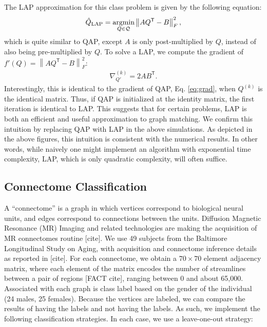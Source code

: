 \documentclass{article} %
\providecommand{\norm}[1]{\left \lVert#1 \right  \rVert}
\newcommand{\argmin}{\operatornamewithlimits{argmin}}
\newcommand{\T}{^{\ensuremath{\mathsf{T}}}}           %
\providecommand{\mc}[1]{\mathcal{#1}}
\providecommand{\mh}[1]{\hat{#1}}
\begin{document}
The LAP approximation  for this class problem is given by the following equation:
\begin{align} \label{eq:LAP}
	\mh{Q}_{\text{LAP}} = \argmin_{Q \in \mc{Q}} \norm{A Q\T - B }^2_F,
\end{align}
which is quite similar to QAP, except $A$ is only post-multiplied by $Q$, instead of also being pre-multiplied by $Q$. To solve a LAP, we compute the gradient of $f'(Q)=\norm{AQ\T-B}_F^2$:
\begin{align} \label{eq:grad2}
	\nabla_{Q'}^{(k)} = 2A B\T. 
\end{align}
Interestingly, this is identical to the gradient of QAP, Eq. \eqref{eq:grad}, when $Q^{(k)}$ is the identical matrix.  Thus, if QAP is initialized at the identity matrix, the first iteration is identical to LAP.  This suggests that for certain problems, LAP is both an efficient and useful approximation to graph matching.  We confirm this intuition by replacing QAP with LAP in the above simulations.  As depicted in the above figures, this intuition is consistent with the numerical results. In other words, while naively one might implement an algorithm with exponential time complexity, LAP, which is only quadratic complexity, will often suffice.



\subsection{Connectome Classification} %
\label{sub:connectome_classification}

A ``connectome'' is a graph in which vertices correspond to biological neural units, and edges correspond to connections between the units.  Diffusion Magnetic Resonance (MR) Imaging and related technologies are making the acquisition of MR connectomes routine [cite].  We use 49 subjects from the Baltimore Longitudinal Study on Aging, with acquisition and connectome inference details as reported in [cite].  For each connectome, we obtain a $70 \times 70$ element adjacency matrix, where each element of the matrix encodes the number of streamlines between a pair of regions [FACT cite], ranging between 0 and about 65,000.  Associated with each graph is class label based on the gender of the individual (24 males, 25 females).  Because the vertices are labeled, we can compare the results of having the labels and not having the labels.  As such, we implement the following classification strategies.  In each case, we use a leave-one-out strategy:
\end{document}
